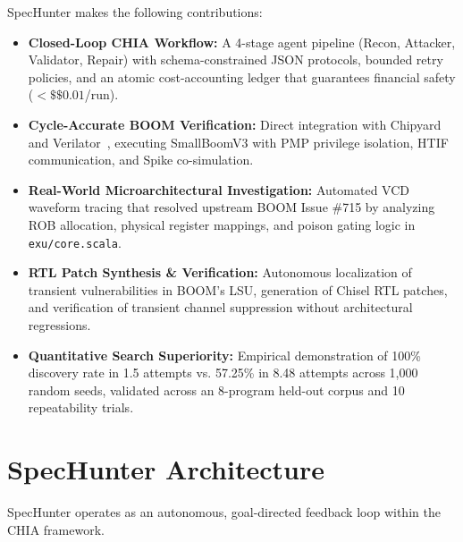 \documentclass[conference,10pt]{IEEEtran}
\begin{document}
SpecHunter makes the following contributions:
\begin{itemize}
    \item \textbf{Closed-Loop CHIA Workflow:} A 4-stage agent pipeline (Recon, Attacker, Validator, Repair) with schema-constrained JSON protocols, bounded retry policies, and an atomic cost-accounting ledger that guarantees financial safety ($<\$\$0.01$/run).
    \item \textbf{Cycle-Accurate BOOM Verification:} Direct integration with Chipyard~\cite{chipyard} and Verilator~\cite{verilator}, executing SmallBoomV3 with PMP privilege isolation, HTIF communication, and Spike co-simulation.
    \item \textbf{Real-World Microarchitectural Investigation:} Automated VCD waveform tracing that resolved upstream BOOM Issue \#715 by analyzing ROB allocation, physical register mappings, and poison gating logic in \texttt{exu/core.scala}.
    \item \textbf{RTL Patch Synthesis \& Verification:} Autonomous localization of transient vulnerabilities in BOOM's LSU, generation of Chisel RTL patches, and verification of transient channel suppression without architectural regressions.
    \item \textbf{Quantitative Search Superiority:} Empirical demonstration of 100\% discovery rate in 1.5 attempts vs. 57.25\% in 8.48 attempts across 1,000 random seeds, validated across an 8-program held-out corpus and 10 repeatability trials.
\end{itemize}

\section{SpecHunter Architecture}
SpecHunter operates as an autonomous, goal-directed feedback loop within the CHIA framework.
\end{document}
